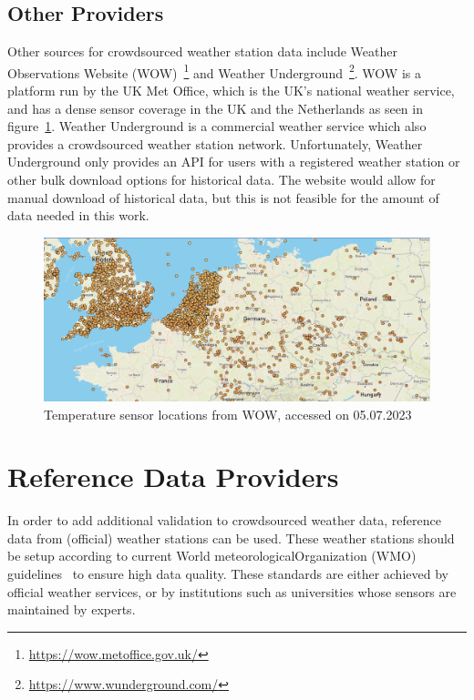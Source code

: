 \subsection{Other Providers}

Other sources for crowdsourced weather station data include Weather Observations Website (WOW)~\footnote{\url{https://wow.metoffice.gov.uk/}} and Weather Underground~\footnote{\url{https://www.wunderground.com/}}.
WOW is a platform run by the UK Met Office, which is the UK's national weather service, and has a dense sensor coverage in the UK and the Netherlands as seen in figure~\ref{fig:wow sensor locations}.
Weather Underground is a commercial weather service which also provides a crowdsourced weather station network. Unfortunately, Weather Underground only provides an API for users with a registered weather station or other bulk download options for historical data. The website would allow for manual download of historical data, but this is not feasible for the amount of data needed in this work.

\begin{figure}[ht]
    \centering
    \includegraphics[width=1\textwidth]{images/wow_sensor_locations.png}
    \caption{Temperature sensor locations from WOW, accessed on 05.07.2023}
    \label{fig:wow sensor locations}
\end{figure}

\section{Reference Data Providers}

In order to add additional validation to crowdsourced weather data, reference data from (official) weather stations can be used. These weather stations should be setup according to current World meteorologicalOrganization (WMO) guidelines~\cite{wmo2018guide} to ensure high data quality. These standards are either achieved by official weather services, or by institutions such as universities whose sensors are maintained by experts.

